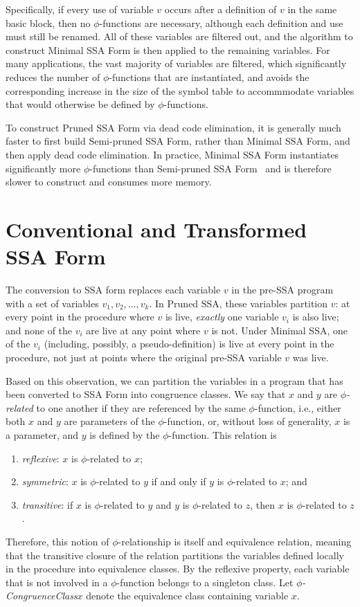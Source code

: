 Specifically, if every use of variable $v$ occurs after
a definition of $v$ in the same basic block, then no
$\phi$-functions are necessary, although each definition
and use must still be renamed. All of these variables
are filtered out, and the algorithm to construct
Minimal SSA Form is then applied to the remaining 
variables. For many applications, the vast majority 
of variables are filtered, which significantly reduces
the number of $\phi$-functions that are instantiated,
and avoids the corresponding increase in the size of the
symbol table to accommmodate variables that would otherwise
be defined by $\phi$-functions. 

To construct Pruned SSA Form via dead code elimination,
it is generally much faster to first build Semi-pruned SSA
Form, rather than Minimal SSA Form, and then apply
dead code elimination. In practice, Minimal SSA Form
instantiates significantly more $\phi$-functions than
Semi-pruned SSA Form~\cite{BriggsJul98} and is
therefore slower to construct and consumes more
memory. 

\section{Conventional and Transformed SSA Form}

The conversion to SSA form replaces each variable $v$ in the pre-SSA
program with a set of variables $v_{1}, v_{2}, \ldots, v_{k}$. In Pruned
SSA, these variables partition $v$: at every point in the procedure where $v$ is
live, \emph{exactly} one variable $v_{i}$ is also live; and none of
the $v_{i}$ are live at any point where $v$ is not. Under Minimal SSA, 
one of the $v_{i}$ (including, possibly, a pseudo-definition) is live
at every point in the procedure, not just at points where the original
pre-SSA variable $v$ was live. 

Based on this observation, we can partition the variables in a 
program that has been converted to SSA Form into congruence classes. 
We say that $x$ and $y$ are \emph{$\phi$-related} to one another
if they are referenced by the same $\phi$-function, i.e., 
either both $x$ and $y$ are parameters of the $\phi$-function, or,
without loss of generality, $x$ is a parameter, and $y$ is defined by
the $\phi$-function. This relation is
\begin{enumerate}
\item \emph{reflexive}: $x$ is $\phi$-related to $x$;
\item \emph{symmetric}: $x$ is $\phi$-related to $y$ if and only if
$y$ is $\phi$-related to $x$; and
\item \emph{transitive}: if $x$ is $\phi$-related to $y$ and 
$y$ is $\phi$-related to $z$, then $x$ is $\phi$-related to $z$.
\end{enumerate}
Therefore, this notion of $\phi$-relationship is itself and equivalence
relation, meaning that the transitive closure of the relation partitions
the variables defined locally in the procedure into equivalence classes. 
By the reflexive property, each variable that is not involved in a 
$\phi$-function belongs to a singleton class. 
Let \emph{$\phi$-CongruenceClass${x}$} denote the equivalence class 
containing variable $x$. 

